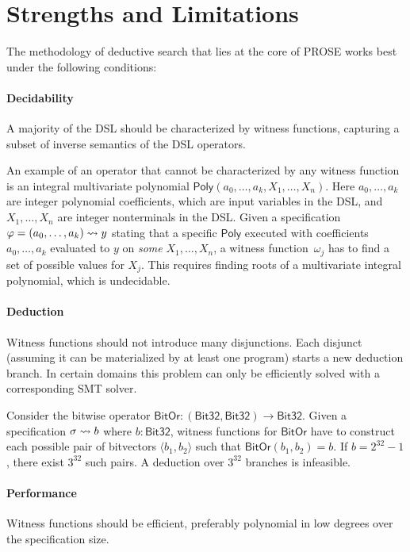 \section{Strengths and Limitations}
\label{sec:prose:discussion}
The methodology of deductive search that lies at the core of PROSE works best under the following conditions:

\paragraph{Decidability}
A majority of the DSL should be characterized by witness functions, capturing a subset of inverse semantics of the DSL
operators.

An example of an operator that cannot be characterized by any witness function is an integral multivariate polynomial
$\mathsf{Poly}(a_0, \dots, a_k, X_1, \dots, X_n)$.
Here $a_0, \dots, a_k$ are integer polynomial coefficients, which are input variables in the DSL,
and $X_1, \dots, X_n$ are integer nonterminals in the DSL.
Given a specification $\varphi = (a_0, \dots, a_k) \rightsquigarrow y$ stating that a specific $\mathsf{Poly}$ executed with
coefficients $a_0, \dots, a_k$ evaluated to $y$ on \emph{some} $X_1, \dots, X_n$, a witness function~$\omega_j$ has to
find a set of possible values for $X_j$.
This requires finding roots of a multivariate integral polynomial, which is undecidable.

\paragraph{Deduction}
Witness functions should not introduce many disjunctions.
Each disjunct (assuming it can be materialized by at least one program) starts a new deduction branch.
In certain domains this problem can only be efficiently solved with a corresponding SMT solver.

Consider the bitwise operator $\mathsf{BitOr}\colon (\mathsf{Bit32}, \mathsf{Bit32}) \to \mathsf{Bit32}$.
Given a specification $\sigma \rightsquigarrow b$ where $b\colon \mathsf{Bit32}$, witness functions for $\mathsf{BitOr}$
have to construct each possible pair of bitvectors $\langle b_1, b_2\rangle$ such that $\mathsf{BitOr}(b_1, b_2) = b$.
If $b = 2^{32} - 1$, there exist $3^{32}$ such pairs.
A deduction over $3^{32}$ branches is infeasible.

\paragraph{Performance}
Witness functions should be efficient, preferably polynomial in low degrees over the specification size.

